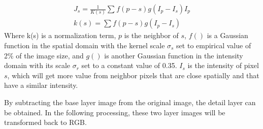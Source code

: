 \documentclass[10pt,twocolumn,letterpaper]{article}
\begin{document}
\begin{align}
	J_s = \frac{1}{K(s)}\sum_{}^{}f(p-s)g(I_p-I_s)I_p\\
	k(s) = \sum_{}^{}f(p-s)g(I_p-I_s)
\end{align}
Where k(s) is a normalization term, $p$ is the neighbor of $s$, $f()$ is a Gaussian function in the spatial domain with the kernel scale $\sigma_s$ set to empirical value of 2\% of the image size, and $g()$ is another Gaussian function in the intensity domain with its scale $\sigma_r$ set to a constant value of 0.35\cite{durand2002fast}. $I_s$ is the intensity of pixel $s$, which will get more value from neighbor pixels that are close spatially and that have a similar intensity.

By subtracting the base layer image from the original image, the detail layer can be obtained. In the following processing, these two layer images will be transformed back to RGB.
\end{document}
